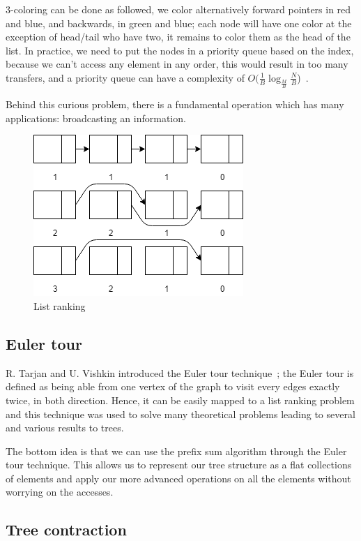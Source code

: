 3-coloring can be done as followed, we color alternatively forward pointers in red and blue, and backwards, in green and blue; each node will have one color at the exception of head/tail who have two, it remains to color them as the head of the list. In practice, we need to put the nodes in a priority queue based on the index, because we can't access any element in any order, this would result in too many transfers, and a priority queue can have a complexity of $O(\frac{1}{B}\log_{\frac{M}{B}} \frac{N}{B}$)~\cite{arge2007optimal}.

Behind this curious problem, there is a fundamental operation which has many applications: broadcasting an information.

\begin{figure}[!htb]
    \centering
    \includegraphics[width=0.5\linewidth]{Chapters/GPU/Algorithms/ListRanking.png} 
    \caption{List ranking}
\end{figure}

\subsection{Euler tour}

R. Tarjan and U. Vishkin introduced the Euler tour technique~\cite{tarjan1985efficient}; the Euler tour is defined as being able from one vertex of the graph to visit every edges exactly twice, in both direction. Hence, it can be easily mapped to a list ranking problem and this technique was used to solve many theoretical problems leading to several and various results to trees.

The bottom idea is that we can use the prefix sum algorithm through the Euler tour technique. This allows us to represent our tree structure as a flat collections of elements and apply our more advanced operations on all the elements without worrying on the accesses.

\subsection{Tree contraction}

